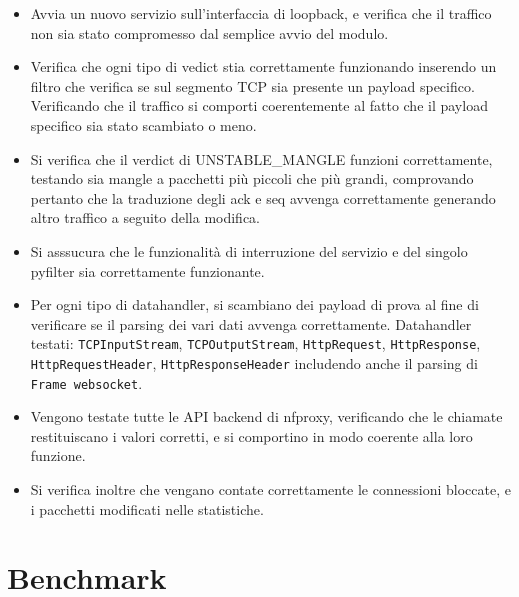 \begin{itemize}
    \setlength{\itemsep}{2pt}
    \setlength{\parskip}{2pt}
    \item Avvia un nuovo servizio sull'interfaccia di loopback, e verifica che il traffico non sia stato compromesso dal semplice avvio del modulo.
    \item Verifica che ogni tipo di vedict stia correttamente funzionando inserendo un filtro che verifica se sul segmento TCP sia presente un payload specifico.
    Verificando che il traffico si comporti coerentemente al fatto che il payload specifico sia stato scambiato o meno.
    \item Si verifica che il verdict di UNSTABLE\_MANGLE funzioni correttamente, testando sia mangle a pacchetti più piccoli che più grandi, comprovando
    pertanto che la traduzione degli ack e seq avvenga correttamente generando altro traffico a seguito della modifica.
    \item Si asssucura che le funzionalità di interruzione del servizio e del singolo pyfilter sia correttamente funzionante.
    \item Per ogni tipo di datahandler, si scambiano dei payload di prova al fine di verificare se il parsing dei vari dati avvenga correttamente.
    Datahandler testati: \texttt{TCPInputStream}, \texttt{TCPOutputStream}, \texttt{HttpRequest}, \texttt{HttpResponse}, \texttt{HttpRequestHeader},
    \texttt{HttpResponseHeader} includendo anche il parsing di \texttt{Frame websocket}.
    \item Vengono testate tutte le API backend di nfproxy, verificando che le chiamate restituiscano i valori corretti, e si comportino in modo coerente alla loro funzione.
    \item Si verifica inoltre che vengano contate correttamente le connessioni bloccate, e i pacchetti modificati nelle statistiche.
\end{itemize}

\section{Benchmark}

